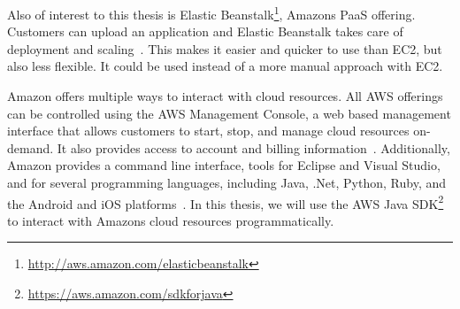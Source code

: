 Also of interest to this thesis is Elastic Beanstalk\footnote{\url{http://aws.amazon.com/elasticbeanstalk}}, Amazons PaaS offering.
Customers can upload an application and Elastic Beanstalk takes care of deployment and scaling~\autocite{aws:beanstalk}.
This makes it easier and quicker to use than EC2, but also less flexible.
It could be used instead of a more manual approach with EC2.

Amazon offers multiple ways to interact with cloud resources.
All AWS offerings can be controlled using the AWS Management Console, a web based management interface that allows customers to start, stop, and manage cloud resources on-demand.
It also provides access to account and billing information~\autocite{aws:managementconsole}.
Additionally, Amazon provides a command line interface, tools for Eclipse and Visual Studio, and  for several programming languages, including Java, .Net, Python, Ruby, and the Android and iOS platforms~\autocite{aws:tools}.
In this thesis, we will use the AWS Java SDK\footnote{\url{https://aws.amazon.com/sdkforjava}} to interact with Amazons cloud resources programmatically.
